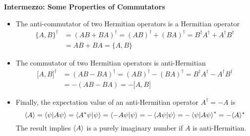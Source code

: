 \documentclass[11pt, a4paper]{article}
\begin{document}
\textbf{Intermezzo: Some Properties of Commutators}
\begin{itemize}
	\item The anti-commutator of two Hermitian operators is a Hermitian operator
	\begin{align*}
		\big\{A, B\big\}^{\dagger} &= (AB + BA)^{\dagger} = (AB)^{\dagger} + (BA)^{\dagger} = B^{\dagger}A^{\dagger} + A^{\dagger}B^{\dagger}\\
		&=AB + BA = \big\{A, B\big\}
	\end{align*}
	
	\item The commutator of two Hermitian operators is anti-Hermitian
	\begin{align*}
		\big[A, B\big]^{\dagger} &= (AB - BA)^{\dagger} = (AB)^{\dagger} - (BA)^{\dagger} = B^{\dagger}A^{\dagger} - A^{\dagger}B^{\dagger}\\
		&= - (AB - BA) = - \big[A, B\big]
	\end{align*}
	
	\item Finally, the expectation value of an anti-Hermitian operator $ A^{\dagger} = - A $ is
	\begin{equation*}
		\langle A \rangle = \braket{\psi}{A\psi} = \braket{A^{*}\psi}{\psi} = \braket{-A\psi}{\psi} = - \braket{A\psi}{\psi} = - \braket{\psi}{A\psi}^{*} = - \langle A \rangle^{*}
	\end{equation*}
	The result implies $ \expval{A} $ is a purely imaginary number if $ A $ is anti-Hermitian.
\end{itemize}
\end{document}
